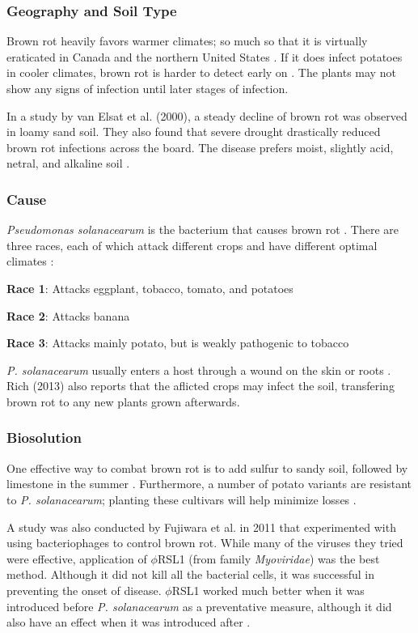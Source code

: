 \documentclass[12pt]{article}
\begin{document}
\subsubsection{Geography and Soil Type}
Brown rot heavily favors warmer climates; so much so that it is virtually eraticated in Canada and the northern United States \autocite{rich2013potato}. If it does infect potatoes in cooler climates, brown rot is harder to detect early on \autocite{kabeil2008potato}. The plants may not show any signs of infection until later stages of infection.

In a study by van Elsat et al. (2000), a steady decline of brown rot was observed in loamy sand soil. They also found that severe drought drastically reduced brown rot infections across the board. The disease prefers moist, slightly acid, netral, and alkaline soil \autocite{rich2013potato}.

\subsubsection{Cause}

\emph{Pseudomonas solanacearum} is the bacterium that causes brown rot \autocite{van2000survival}. There are three races, each of which attack different crops and have different optimal climates \autocite{rich2013potato}:

\textbf{Race 1}: Attacks eggplant, tobacco, tomato, and potatoes

\textbf{Race 2}: Attacks banana

\textbf{Race 3}: Attacks mainly potato, but is weakly pathogenic to tobacco

\emph{P. solanacearum} usually enters a host through a wound on the skin or roots \autocite{rich2013potato}. Rich (2013) also reports that the aflicted crops may infect the soil, transfering brown rot to any new plants grown afterwards.

\subsubsection{Biosolution}

One effective way to combat brown rot is to add sulfur to sandy soil, followed by limestone in the summer \autocite{rich2013potato}. Furthermore, a number of potato variants are resistant to \emph{P. solanacearum}; planting these cultivars will help minimize losses \autocite{rich2013potato}.

A study was also conducted by Fujiwara et al. in 2011 that experimented with using bacteriophages to control brown rot. While many of the viruses they tried were effective, application of {$\phi$}RSL1 (from family \emph{Myoviridae}) was the best method. Although it did not kill all the bacterial cells, it was successful in preventing the onset of disease. {$\phi$}RSL1 worked much better when it was introduced before \emph{P. solanacearum} as a preventative measure, although it did also have an effect when it was introduced after \autocite{fujiwara2011biocontrol}.
\end{document}
